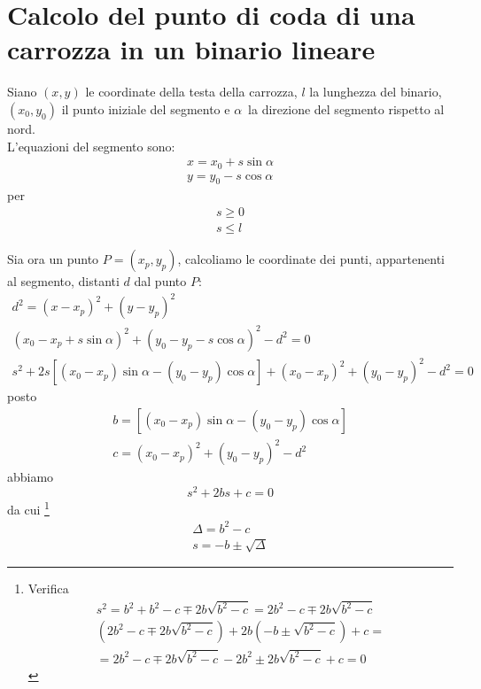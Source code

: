 \section{Calcolo del punto di coda di una carrozza in un binario lineare}

Siano $(x,y)$ le coordinate della testa della carrozza,
$l$ la lunghezza del binario,
$(x_0,y_0)$ il punto iniziale del segmento e
$\alpha$\ la direzione del segmento rispetto al nord.
\\

L'equazioni del segmento sono:  
\begin{equation}
  \label{eq:no1}
  \begin{array}{l}
    x=x_0+s\sin\alpha
    \\
    y=y_0-s\cos\alpha
  \end{array}
\end{equation}
per
\begin{eqnarray}
  \label{eq:no2}
  s\ge 0
  \\
  \label{eq:no3}
  s\le l
\end{eqnarray}

Sia ora un punto $P=(x_p,y_p)$, calcoliamo le coordinate dei punti,
appartenenti al segmento, distanti $d$ dal punto $P$:
\begin{displaymath}
  \begin{array}{l}
    d^2=(x-x_p)^2+(y-y_p)^2
    \\
    (x_0-x_p+s\sin\alpha)^2+(y_0-y_p-s\cos\alpha)^2-d^2=0
    \\
    s^2
    +2s[(x_0-x_p)\sin\alpha-(y_0-y_p)\cos\alpha]
    +(x_0-x_p)^2+(y_0-y_p)^2-d^2=0
  \end{array}
\end{displaymath}
posto
\begin{eqnarray}
  b=[(x_0-x_p)\sin\alpha-(y_0-y_p)\cos\alpha]
  \\
  c=(x_0-x_p)^2+(y_0-y_p)^2-d^2
\end{eqnarray}
abbiamo
\begin{displaymath}
  s^2+2bs+c=0
\end{displaymath}
da cui
\footnote{
  Verifica
  \begin{displaymath}
    \begin{array}{l}
      s^2=b^2+b^2-c\mp2b\sqrt{b^2-c}=2b^2-c\mp2b\sqrt{b^2-c}
      \\
      (2b^2-c\mp2b\sqrt{b^2-c})+2b(-b \pm\sqrt{b^2-c})+c=
      \\
      =2b^2-c\mp2b\sqrt{b^2-c}-2b^2\pm2b\sqrt{b^2-c}+c=0
    \end{array}
  \end{displaymath}
}
\begin{eqnarray}
  \Delta=b^2-c
  \\
  \label{eq:no4}
  s=-b\pm\sqrt\Delta
\end{eqnarray}

